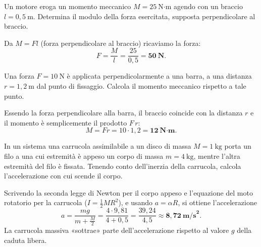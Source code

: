 
\begin{question}[ID=6.4, subtitle={Forza di un motore dato il momento meccanico e il braccio}, tags={corpo rigido, momento meccanico}, difficulty=facile]
Un motore eroga un momento meccanico $M = 25\ \text{N·m}$ agendo con un braccio $l = 0{,}5\ \text{m}$. Determina il modulo della forza esercitata, supposta perpendicolare al braccio.
\begin{solution}
Da $M = Fl$ (forza perpendicolare al braccio) ricaviamo la forza:
\[
F = \frac{M}{l} = \frac{25}{0{,}5} = \mathbf{50\ \text{N}}.
\]
\end{solution}
\end{question}


\begin{question}[ID=6.5, subtitle={Momento meccanico di una forza perpendicolare a una barra}, tags={corpo rigido, momento meccanico}, difficulty=facile]
Una forza $F = 10\ \text{N}$ è applicata perpendicolarmente a una barra, a una distanza $r = 1{,}2\ \text{m}$ dal punto di fissaggio. Calcola il momento meccanico rispetto a tale punto.
\begin{solution}
Essendo la forza perpendicolare alla barra, il braccio coincide con la distanza $r$ e il momento è semplicemente il prodotto $F\,r$:
\[
M = Fr = 10\cdot 1{,}2 = \mathbf{12\ \text{N·m}}.
\]
\end{solution}
\end{question}


\begin{question}[ID=7.1, subtitle={Macchina di Atwood con carrucola massiva — singola massa}, tags={corpo rigido, macchina di Atwood, carrucola}, difficulty=media]
In un sistema una carrucola assimilabile a un disco di massa $M = 1\ \text{kg}$ porta un filo a una cui estremità è appeso un corpo di massa $m = 4\ \text{kg}$, mentre l'altra estremità del filo è fissata. Tenendo conto dell'inerzia della carrucola, calcola l'accelerazione con cui scende il corpo.
\begin{solution}
Scrivendo la seconda legge di Newton per il corpo appeso e l'equazione del moto rotatorio per la carrucola ($I = \tfrac{1}{2}MR^2$), e usando $a = \alpha R$, si ottiene l'accelerazione
\[
a = \frac{mg}{m + \tfrac{M}{2}} = \frac{4\cdot 9{,}81}{4 + 0{,}5} = \frac{39{,}24}{4{,}5} \approx \mathbf{8{,}72\ \text{m/s}^2}.
\]
La carrucola massiva «sottrae» parte dell'accelerazione rispetto al valore $g$ della caduta libera.
\end{solution}
\end{question}

